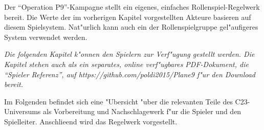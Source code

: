 
Der ``Operation P9''-Kampagne stellt ein eigenes, einfaches Rollenspiel-Regelwerk bereit. Die Werte der im vorherigen Kapitel vorgestellten Akteure basieren auf diesem Spielsystem. Nat"urlich kann auch ein der Rollenspielgruppe gel"aufigeres System verwendet werden.

\emph{Die folgenden Kapitel k"onnen den Spielern zur Verf"ugung gestellt werden. Die Kapitel stehen auch als ein separates, online verf"ugbares PDF-Dokument, die ``Spieler Referenz'', auf \textit{https://github.com/poldi2015/Plane9} f"ur den Download bereit.}

Im Folgenden befindet sich eine "Ubersicht "uber die relevanten Teile des C23-Universums als Vorbereitung und Nachschlagewerk f"ur die Spieler und den Spielleiter. Anschlie\3end wird das Regelwerk vorgestellt.





